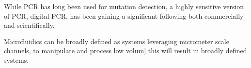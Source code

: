 While  PCR  has  long  been  used  for  mutation  detection,  a  highly  sensitive  version  of PCR,  digital  PCR,  has  been  gaining  a  significant  following  both  commercially  and scientifically. 

Microfluidics   can   be   broadly   defined   as   systems   leveraging   micrometer  scale channels,  to  manipulate  and  process  low  volum]
this will result in broadly defined systems.
